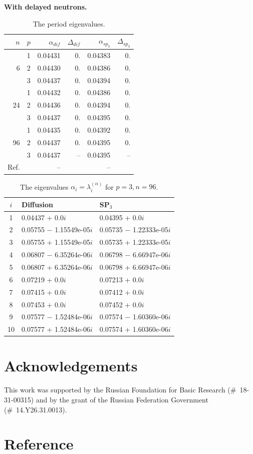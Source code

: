 \documentclass[authoryear]{elsarticle}
\begin{document}
\textbf{With delayed neutrons.}

\begin{table}[h]
\caption{The period eigenvalues.}
\label{tab:hwr_alpha_del}
\begin{center}
\begin{tabular}{rrrrrr}
\hline
$n$ & $p$ & $\alpha_{dif}$ & $\Delta_{dif}$ &$\alpha_{sp_3}$& $\Delta_{sp_3}$ \\
\hline
	& 1	&0.04431 & 0. & 0.04383 & 0.\\
6	& 2	&0.04430 & 0. & 0.04386 & 0.\\
	& 3	&0.04437 & 0. & 0.04394 & 0.\\ 
\hline
	& 1	&0.04432 & 0. & 0.04386 & 0.\\
24& 2	&0.04436 & 0. & 0.04394 & 0.\\
	& 3	&0.04437 & 0. & 0.04395 & 0.\\ 
\hline
	& 1	&0.04435 & 0. & 0.04392 & 0.\\
96& 2	&0.04437 & 0. & 0.04395 & 0.\\
	& 3	&0.04437 & -- & 0.04395 & -- \\ 
\hline
Ref.& & -- & & -- \\ 
\hline
\end{tabular}
\end{center}
\end{table}

\begin{table}[h]
\caption{The eigenvalues $\alpha_i=\lambda_i^{(\alpha)}$ for $p=3, n=96$.}
\label{tab:hwr_alpha_del_10}
\begin{center}
\begin{tabular}{c l l}
\hline
$i$ & Diffusion & SP$_3$ \\
\hline
1 &0.04437 + 0.0$i$     		&0.04395 + 0.0$i$ \\
2 &0.05755 $-$ 1.15549e-05$i$ 	&0.05735 $-$ 1.22333e-05$i$ \\
3 &0.05755 + 1.15549e-05$i$   	&0.05735 + 1.22333e-05$i$ \\
4 &0.06807 $-$ 6.35264e-06$i$   &0.06798 $-$ 6.66947e-06$i$ \\
5 &0.06807 + 6.35264e-06$i$     &0.06798 + 6.66947e-06$i$ \\
6 &0.07219 + 0.0$i$             &0.07213 + 0.0$i$ \\
7 &0.07415 + 0.0$i$             &0.07412 + 0.0$i$ \\
8 &0.07453 + 0.0$i$          	&0.07452 + 0.0$i$ \\
9 &0.07577 $-$ 1.52484e-06$i$   &0.07574 $-$ 1.60360e-06$i$ \\
10&0.07577 + 1.52484e-06$i$     &0.07574 + 1.60360e-06$i$ \\
\hline
\end{tabular}
\end{center}
\end{table}

\pagebreak
\newpage
\section*{Acknowledgements}

This work was supported by the Russian Foundation for Basic Research (\#~18-31-00315) 
and by the grant of the Russian Federation Government (\#~14.Y26.31.0013).

\section*{Reference}

\end{document}
